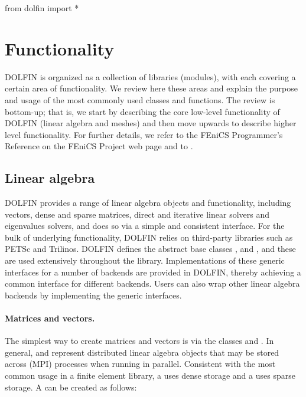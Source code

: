 \begin{python}
from dolfin import *
\end{python}

\section{Functionality}
\label{sec:logg-2:functionality}

DOLFIN is organized as a collection of libraries (modules), with each
covering a certain area of functionality. We review here these areas
and explain the purpose and usage of the most commonly used classes and
functions. The review is bottom-up; that is, we start by describing the
core low-level functionality of DOLFIN (linear algebra and meshes) and
then move upwards to describe higher level functionality. For further
details, we refer to the FEniCS Programmer's Reference on the FEniCS
Project web page and to \citet{LoggWells2010}.

\subsection{Linear algebra}

DOLFIN provides a range of linear algebra objects and functionality,
including vectors, dense and sparse matrices, direct and iterative linear
solvers and eigenvalues solvers, and does so via a simple and consistent
interface.  For the bulk of underlying functionality, DOLFIN relies
on third-party libraries such as PETSc and Trilinos.  DOLFIN defines
the abstract base classes , 
and , and these are used extensively throughout the
library.  Implementations of these generic interfaces for a number of
backends are provided in DOLFIN, thereby achieving a common interface for
different backends.  Users can also wrap other linear algebra backends
by implementing the generic interfaces.

\paragraph{Matrices and vectors.}

The simplest way to create matrices and vectors is via the classes
 and . In general,  and 
represent distributed linear algebra objects that may be stored across
(MPI) processes when running in parallel. Consistent with the most common
usage in a finite element library, a  uses dense storage
and a  uses sparse storage.  A  can be created
as follows:

